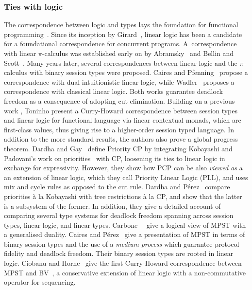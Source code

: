 \subsubsection*{Ties with logic}
The correspondence between logic and types lays the foundation for functional programming~\cite{wadler15}.
Since its inception by Girard~\cite{girard87}, linear logic has been a candidate for a foundational correspondence for concurrent programs.
A~correspondence with linear $\pi$-calculus was established early on by Abramsky~\cite{abramsky94} and Bellin and Scott~\cite{bellinscott94}. Many years later, several correspondences between linear logic and the $\pi$-calculus with binary session types were proposed. Caires and Pfenning~\cite{cairespfenning10} propose a correspondence with dual intuitionistic linear logic, while Wadler~\cite{wadler12} proposes a correspondence with classical linear logic. Both works guarantee deadlock freedom as a consequence of adopting cut elimination.
Building on a previous work \cite{cairespfenning10}, Toninho \etal \cite{toninhoetal13} present a Curry-Howard correspondence between session types and linear logic for functional language via linear contextual monads, which are first-class values, thus giving rise to a higher-order session typed  language. In addition to the more standard results, the authors also prove a global progress theorem.
Dardha and Gay~\cite{dardhagay18extended} define Priority CP by integrating Kobayashi and Padovani's work on priorities~\cite{kobayashi06,padovani14} with CP, loosening its ties to linear logic in exchange for expressivity. However, they show how PCP can be also \emph{viewed as} a an extension of linear logic, which they call Priority Linear Logic (PLL), and uses mix and cycle rules as opposed to the cut rule.
Dardha and P\'{e}rez~\cite{dardhaperez15extended,dardhaperez15,DardhaP22} compare priorities \`a la Kobayashi with tree restrictions \`a la CP, and show that the latter is a subsystem of the former. In addition, they give a detailed account of comparing several type systems for deadlock freedom spanning across session types, linear logic, and linear types.
Carbone~\etal~\cite{CarboneMSY15,carbonelindley16} give a logical view of MPST with a generalised duality.
Caires and P\'{e}rez~\cite{CairesP16} give a presentation of MPST in terms of binary session types and the use of a \emph{medium process} which guarantee protocol fidelity and deadlock freedom. Their binary session types are rooted in linear logic.
Ciobanu and Horne~\cite{CiobanuH15} give the first Curry-Howard correspondence between MPST and BV~\cite{Guglielmi07}, a conservative extension of linear logic with a non-commutative operator for sequencing.
